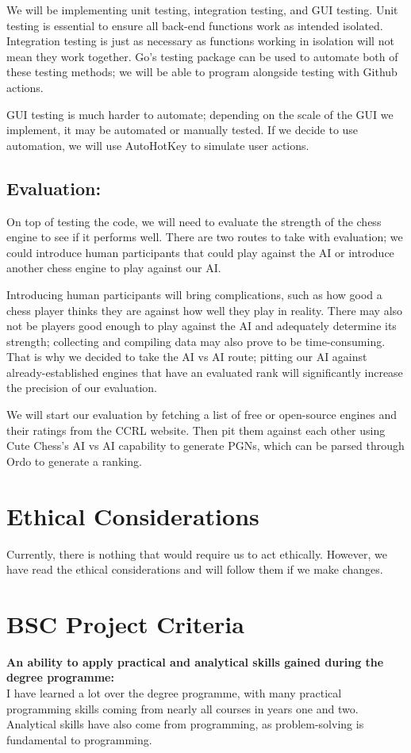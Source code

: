 \documentclass{article}
\begin{document}
We will be implementing unit testing, integration testing, and GUI testing. Unit testing is essential to ensure all back-end functions work as intended isolated. Integration testing is just as necessary as functions working in isolation will not mean they work together. Go's testing package can be used to automate both of these testing methods; we will be able to program alongside testing with Github actions.

GUI testing is much harder to automate; depending on the scale of the GUI we implement, it may be automated or manually tested. If we decide to use automation, we will use AutoHotKey\cite{AHK} to simulate user actions.

\subsection{Evaluation:} \label{Eval}
On top of testing the code, we will need to evaluate the strength of the chess engine to see if it performs well. There are two routes to take with evaluation; we could introduce human participants that could play against the AI or introduce another chess engine to play against our AI.

Introducing human participants will bring complications, such as how good a chess player thinks they are against how well they play in reality. There may also not be players good enough to play against the AI and adequately determine its strength; collecting and compiling data may also prove to be time-consuming. That is why we decided to take the AI vs AI route; pitting our AI against already-established engines that have an evaluated rank will significantly increase the precision of our evaluation.

We will start our evaluation by fetching a list of free or open-source engines and their ratings from the CCRL website\cite{ccrl}. Then pit them against each other using Cute Chess's\cite{cutechess} AI vs AI capability to generate PGNs, which can be parsed through Ordo\cite{ordo} to generate a ranking.

\section{Ethical Considerations}
Currently, there is nothing that would require us to act ethically. However, we have read the ethical considerations and will follow them if we make changes.

\section{BSC Project Criteria} %
\noindent\textbf{An ability to apply practical and analytical skills gained during the degree programme:}\\
I have learned a lot over the degree programme, with many practical programming skills coming from nearly all courses in years one and two. Analytical skills have also come from programming, as problem-solving is fundamental to programming.
\end{document}
